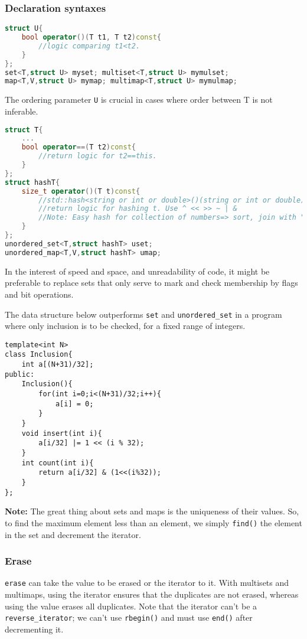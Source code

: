 \documentclass{article}
\begin{document}
\subsubsection*{Declaration syntaxes}
\begin{lstlisting}[caption={Sets and Maps},language=C++]
struct U{
    bool operator()(T t1, T t2)const{
        //logic comparing t1<t2.
    }
};
set<T,struct U> myset; multiset<T,struct U> mymulset;
map<T,V,struct U> mymap; multimap<T,struct U> mymulmap;
\end{lstlisting}
The ordering parameter \texttt{U} is crucial in cases where order between T is not inferable.
\begin{lstlisting}[caption={Unordered sets and maps},language=C++]
struct T{
    ...
    bool operator==(T t2)const{
        //return logic for t2==this.
    }
};
struct hashT{
    size_t operator()(T t)const{
        //std::hash<string or int or double>()(string or int or double)
        //return logic for hashing t. Use ^ << >> ~ | &
        //Note: Easy hash for collection of numbers=> sort, join with ","
    }
};
unordered_set<T,struct hashT> uset;
unordered_map<T,V,struct hashT> umap;
\end{lstlisting}
In the interest of speed and space, and unreadability of code, it might be
preferable to replace sets that only serve to mark and check membership
by flags and bit operations.\\
\begin{center}
\end{center}
The data structure below outperforms \texttt{set} and \texttt{unordered\_set} in a program where only inclusion is to be checked, for a fixed range of integers.
\begin{lstlisting}
template<int N>
class Inclusion{
    int a[(N+31)/32];
public:
    Inclusion(){
        for(int i=0;i<(N+31)/32;i++){
            a[i] = 0;
        }
    }
    void insert(int i){
        a[i/32] |= 1 << (i % 32);
    }
    int count(int i){
        return a[i/32] & (1<<(i%32));
    }
};
\end{lstlisting}
\textbf{Note:} The great thing about sets and maps is the uniqueness of their values.
So, to find the maximum element less than an element, we simply \texttt{find()} the element
in the set and decrement the iterator.
\subsubsection{Erase}
\texttt{erase} can take the value to be erased or the iterator to it. With multisets
and multimaps, using the iterator ensures that the duplicates are not erased,
whereas using the value erases all duplicates. Note that the iterator can't be a
\texttt{reverse\_iterator}; we can't use \texttt{rbegin()} and must use
\texttt{end()} after decrementing it. 
\end{document}
